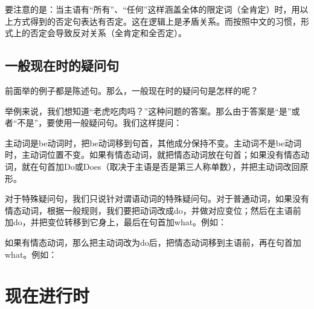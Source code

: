\documentclass[10.5pt, a4paper]{ctexbook} %
\begin{document}
要注意的是：当主语有“所有”、“任何”这样涵盖全体的限定词（全肯定）时，用以上方式得到的否定句表达有否定。这在逻辑上是矛盾关系。而按照中文的习惯，形式上的否定会导致反对关系（全肯定和全否定）。

\subsection{一般现在时的疑问句}

前面举的例子都是陈述句。那么，一般现在时的疑问句是怎样的呢？

举例来说，我们想知道“老虎吃肉吗？”这种问题的答案。那么由于答案是“是”或者“不是”，要使用一般疑问句。我们这样提问：

\begin{liju}
\end{liju}

主动词是be动词时，把be动词移到句首，其他成分保持不变。主动词不是be动词时，主动词位置不变。如果有情态动词，就把情态动词放在句首；如果没有情态动词，就在句首加Do或Does（取决于主语是否是第三人称单数），并把主动词改回原形。

对于特殊疑问句，我们只说针对谓语动词的特殊疑问句。对于普通动词，如果没有情态动词，根据一般规则，我们要把动词改成do，并做对应变位；然后在主语前加do，并把变位转移到它身上，最后在句首加what。例如：

\begin{liju}
\end{liju}

如果有情态动词，那么把主动词改为do后，把情态动词移到主语前，再在句首加what。例如：

\begin{liju}
\end{liju}

\section{现在进行时}
\end{document}
